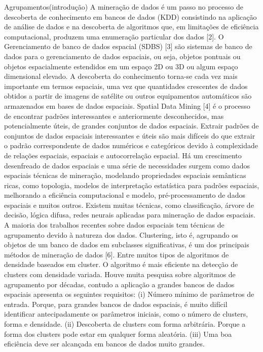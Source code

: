 Agrupamentos(introdução)
A mineração de dados é um passo no processo de descoberta de conhecimento em bancos de dados (KDD) consistindo na aplicação de análise de dados e na descoberta de algoritmos que, em limitações de eficiência computacional, produzem uma enumeração particular dos dados [2].
O Gerenciamento de banco de dados espacial (SDBS) [3] são sistemas de banco de dados para o gerenciamento de dados espaciais, ou seja, objetos pontuais ou objetos espacialmente estendidos em um espaço 2D ou 3D ou algum espaço dimensional elevado. A descoberta do conhecimento torna-se cada vez mais importante em termos espaciais, uma vez que quantidades crescentes de dados obtidos a partir de imagens de satélite ou outros equipamentos automáticos são armazenados em bases de dados espaciais.
Spatial Data Mining [4] é o processo de encontrar padrões interessantes e anteriormente desconhecidos, mas potencialmente úteis, de grandes conjuntos de dados espaciais. Extrair padrões de conjuntos de dados espaciais interessantes e úteis são mais difíceis do que extrair o padrão correspondente de dados numéricos e categóricos devido à complexidade de relações espaciais, espaciais e autocorrelação espacial.
Há um crescimento desenfreado de dados espaciais e uma série de necessidades surgem como dados espaciais
técnicas de mineração, modelando propriedades espaciais semânticas ricas, como topologia, modelos de interpretação estatística para padrões espaciais, melhorando a eficiência computacional e modelo, pré-processamento de dados espaciais e muitos outros.
Existem muitas técnicas, como classificação, árvore de decisão, lógica difusa, redes neurais aplicadas para mineração de dados espaciais. A maioria dos trabalhos recentes sobre dados espaciais tem técnicas de agrupamento devido à natureza dos dados.
Clustering, isto é, agrupando os objetos de um banco de dados em subclasses significativas, é um dos principais métodos de mineração de dados [6]. Entre muitos tipos de algoritmos de densidade baseados em cluster. O algoritmo é mais eficiente na detecção de clusters com densidade variada. Houve muita pesquisa sobre algoritmos de agrupamento por décadas, contudo a aplicação a grandes bancos de dados espaciais apresenta os seguintes requisitos:
(i) Número mínimo de parâmetros de entrada. Porque, para grandes bancos de dados espaciais, é muito difícil identificar antecipadamente os parâmetros iniciais, como o número de clusters, forma e densidade.
(ii) Descoberta de clusters com forma arbitrária. Porque a forma dos clusters pode estar em qualquer forma aleatória.
(iii) Uma boa eficiência deve ser alcançada em bancos de dados muito grandes.




